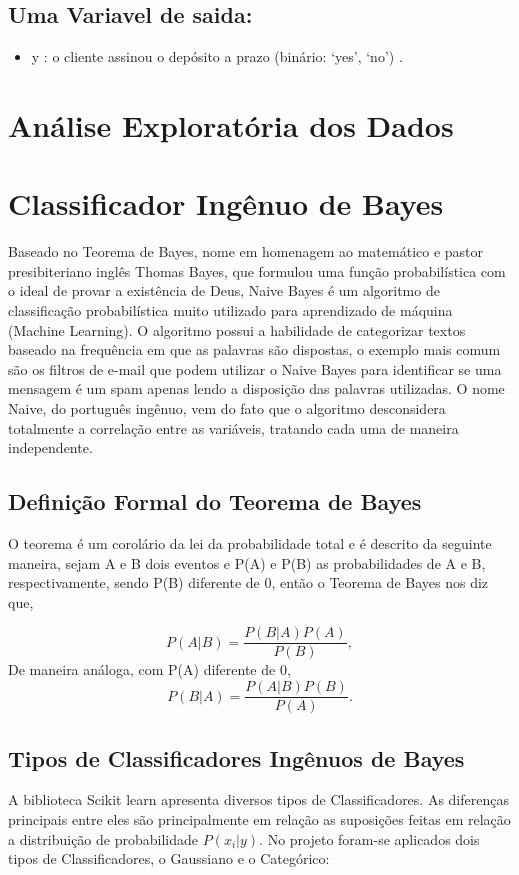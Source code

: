 \documentclass[conference]{IEEEtran}
\begin{document}
\subsection{Uma Variavel de saida:}
\begin{itemize}
    \item y : o cliente assinou o depósito a prazo (binário: ‘yes’, ‘no’) .
\end{itemize}


\section{Análise Exploratória dos Dados}

\section{Classificador Ingênuo de Bayes}
Baseado no Teorema de Bayes, nome em homenagem ao matemático e pastor presibiteriano inglês Thomas Bayes, que formulou uma função probabilística com o ideal de provar a existência de Deus, Naive Bayes é um algoritmo de classificação probabilística muito utilizado para aprendizado de máquina (Machine Learning). O algoritmo possui a habilidade de categorizar textos baseado na frequência em que as palavras são dispostas, o exemplo mais comum são os filtros de e-mail que podem utilizar o Naive Bayes para identificar se uma mensagem é um spam apenas lendo a disposição das palavras utilizadas. O nome Naive, do português ingênuo, vem do fato que o algoritmo desconsidera totalmente a correlação entre as variáveis, tratando cada uma de maneira independente.

\subsection{Definição Formal do Teorema de Bayes}
O teorema é um corolário da lei da probabilidade total e é descrito da seguinte maneira, sejam A e B dois eventos e P(A) e P(B) as probabilidades de A e B, respectivamente, sendo P(B) diferente de 0, então o Teorema de Bayes nos diz que,

\begin{equation}
    P(A|B) = \frac{P(B|A)P(A)}{P(B)},
\end{equation} 
De maneira análoga, com P(A) diferente de 0,  
\begin{equation}
   P(B|A) = \frac{P(A|B)P(B)}{P(A)}.
\end{equation} 

\subsection{Tipos de Classificadores Ingênuos de Bayes}
A biblioteca Scikit learn apresenta diversos tipos de Classificadores. As diferenças principais entre eles são principalmente em relação as suposições feitas em relação a distribuição de probabilidade $P(x_i|y)$. 
No projeto foram-se aplicados dois tipos de Classificadores, o Gaussiano e o Categórico:
\end{document}
